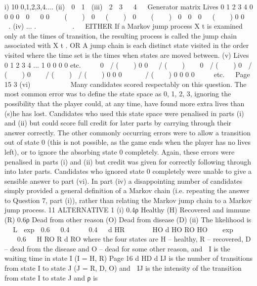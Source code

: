 \documentclass[a4paper,12pt]{article}
\begin{document}
\begin{enumerate}
i)
10
{0,1,2,3,4....}
(ii)

0

1

(iii)

2

3


4


Generator matrix
Lives
0
1
2
3
4
0
0
0
0
 0


0
0
   (    )
 0

 (    )

0


 (    )

0
 0
 0

 (    )
0
0
 
 .
(iv)
...
. 







.  
EITHER
If a Markov jump process X t is examined only at the times of transition, the
resulting process is called the jump chain associated with X t .
OR
A jump chain is each distinct state visited in the order visited where the time
set is the times when states are moved between.
(v)
Lives
0
1
2
3
4
...
1
0
0
0
0
etc. 



0
 / (    )
0
0
  / (    )



0
 / (    )
0
 / (    )
0


 / (    )
 / (    )
0
0
0




 / (    )
0
0
0
0
 
 
etc.


Page 15 %
3
(vi)
  


  
Many candidates scored respectably on this question. The most common error was to define
the state space as {0, 1, 2, 3}, ignoring the possibility that the player could, at any time, have
found more extra lives than (s)he has lost. Candidates who used this state space were
penalised in parts (i) and (ii) but could score full credit for later parts by carrying through
their answer correctly. The other commonly occurring errors were to allow a transition out
of state 0 (this is not possible, as the game ends when the player has no lives left), or to
ignore the absorbing state 0 completely. Again, these errors were penalised in parts (i) and (ii) but credit was given for correctly following through into later parts. Candidates who
ignored state 0 completely were unable to give a sensible answer to part (vi). In part (iv) a
disappointing number of candidates simply provided a general definition of a Markov chain (i.e. repeating the answer to Question 7, part (i)), rather than relating the Markov jump chain
to a Markov jump process.
11
ALTERNATIVE 1
(i)
0.4ρ
Healthy
(H)
Recovered and
immune
(R)
0.6ρ
Dead from other
reason (O)
Dead from disease
(D)
(ii)
The likelihood is
 
L  exp  0.6   0.4   
 0.4  
d HR
     
HO
d HO
RO
HO
   exp        0.6  
H
RO
R
d RO
where
the four states are H – healthy, R – recovered, D – dead from
the disease and O – dead for some other reason, and
 I is the waiting time in state I (I = H, R)
Page 16
d HD %
d IJ is the number of transitions from state I to state J (J = R, D, O)
and  IJ is the intensity of the transition from state I to state J and ρ is

\end{enumerate}
\end{document}
